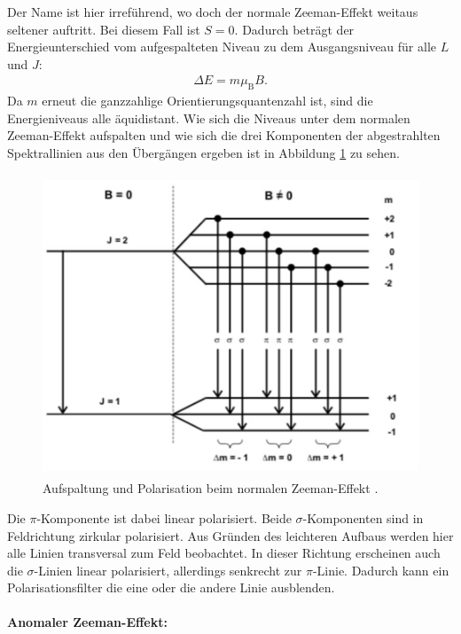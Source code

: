 Der Name ist hier irreführend, wo doch der normale Zeeman-Effekt weitaus seltener auftritt. Bei diesem Fall ist $S=0$. Dadurch beträgt der Energieunterschied vom aufgespalteten Niveau zu dem Ausgangsniveau für alle $L$ und $J$:
\begin{align}
  \Delta E = m \mu_\text{B} B.
\end{align}
Da $m$ erneut die ganzzahlige Orientierungsquantenzahl ist, sind die Energieniveaus alle äquidistant. Wie sich die Niveaus unter dem normalen Zeeman-Effekt aufspalten und wie sich die drei Komponenten der abgestrahlten Spektrallinien aus den Übergängen ergeben ist in Abbildung \ref{fig:aufspaltung} zu sehen.
\begin{figure}
  \centering
  \includegraphics[height=9cm]{besuchInDerNacktmullAufzuchtstation/aufspaltung.pdf}
  \caption{Aufspaltung und Polarisation beim normalen Zeeman-Effekt \cite{anleitung}.}
  \label{fig:aufspaltung}
\end{figure}
Die $\pi$-Komponente ist dabei linear polarisiert. Beide $\sigma$-Komponenten sind in Feldrichtung zirkular polarisiert. Aus Gründen des leichteren Aufbaus werden hier alle Linien transversal zum Feld beobachtet. In dieser Richtung erscheinen auch die $\sigma$-Linien linear polarisiert, allerdings senkrecht zur $\pi$-Linie. Dadurch kann ein Polarisationsfilter die eine oder die andere Linie ausblenden.

\paragraph{Anomaler Zeeman-Effekt:}

